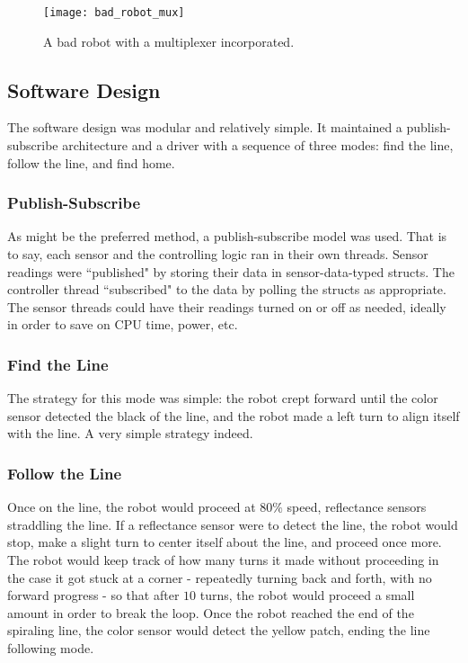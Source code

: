 \documentclass{article}
\begin{document}
    \begin{figure}[h!]
    \centering
    \texttt{[image: bad\_robot\_mux]}
    \caption{A bad robot with a multiplexer incorporated.}
    \label{fig:bad_robot_mux}
    \end{figure}

\newpage
\subsection{Software Design}
The software design was modular and relatively simple. It maintained a publish-subscribe architecture and a driver with a sequence of three modes: find the line, follow the line, and find home.

\subsubsection{Publish-Subscribe}
As might be the preferred method, a publish-subscribe model was used. That is to say, each sensor and the controlling logic ran in their own threads. Sensor readings were ``published" by storing their data in sensor-data-typed structs. The controller thread ``subscribed" to the data by polling the structs as appropriate. The sensor threads could have their readings turned on or off as needed, ideally in order to save on CPU time, power, etc.

\subsubsection{Find the Line}
The strategy for this mode was simple: the robot crept forward until the color sensor detected the black of the line, and the robot made a left turn to align itself with the line. A very simple strategy indeed.

\subsubsection{Follow the Line}
Once on the line, the robot would proceed at $80\%$ speed, reflectance sensors straddling the line. If a reflectance sensor were to detect the line, the robot would stop, make a slight turn to center itself about the line, and proceed once more. The robot would keep track of how many turns it made without proceeding in the case it got stuck at a corner - repeatedly turning back and forth, with no forward progress - so that after $10$ turns, the robot would proceed a small amount in order to break the loop. Once the robot reached the end of the spiraling line, the color sensor would detect the yellow patch, ending the line following mode.
\end{document}
